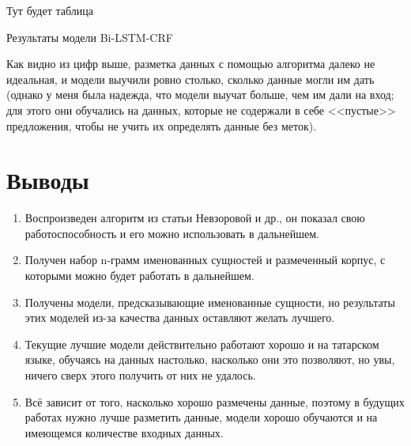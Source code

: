 \begin{table}[h!]

Тут будет таблица

\caption{Результаты модели Bi-LSTM-CRF}
\label{table:BiLSTMCRF_res_1}
\end{table}


Как видно из цифр выше, разметка данных с помощью алгоритма далеко не идеальная, и модели выучили ровно столько, сколько данные могли им дать (однако у меня была надежда, что модели выучат больше, чем им дали на вход; для этого они обучались на данных, которые не содержали в себе <<пустые>> предложения, чтобы не учить их определять данные без меток). 


\section{Выводы}

\begin{enumerate}
\item Воспроизведен алгоритм из статьи Невзоровой и др., он показал свою работоспособность и его можно использовать в дальнейшем. %
\item Получен набор n-грамм именованных сущностей и размеченный корпус, с которыми можно будет работать в дальнейшем.
\item Получены модели, предсказывающие именованные сущности, но результаты этих моделей из-за качества данных оставляют желать лучшего.
\item Текущие лучшие модели действительно работают хорошо и на татарском языке, обучаясь на данных настолько, насколько они это позволяют, но увы, ничего сверх этого получить от них не удалось. 
\item Всё зависит от того, насколько хорошо размечены данные, поэтому в будущих работах нужно лучше разметить данные, модели хорошо обучаются и на имеющемся количестве входных данных.
\end{enumerate}























